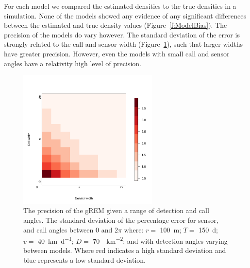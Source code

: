 \documentclass[a4paper,10pt,reqno,oneside]{amsart}
\begin{document}
For each model we compared the estimated densities to the true densities in a simulation. None of the models showed any evidence of any significant differences between the estimated and true density values (Figure~\ref{f:ModelBias}). The precision of the models do vary however. The standard deviation of the error is strongly related to the call and sensor width (Figure~\ref{f:StandardDevaition}), such that larger widths have greater precision. However, even the models with small call and sensor angles have a relativity high level of precision. 

\begin{figure}[t]
        \centering
		\includegraphics[width=7cm]{imgs/ResultStandardDeviation.pdf}
        \caption{The precision of the gREM given a range of detection and call angles. The standard deviation of the percentage error for sensor, and call angles between 0 and $2\pi$ where: $r = $ \SI{100}{\meter}; $T = $ \SI{150}{\day}; $v = $ \SI{40}{\kilo\meter\per\day}; $D = $ \SI{70}{\animals\per\kilo\meter\squared}; and with detection angles varying between models. Where red indicates a high standard deviation and blue represents a low standard deviation.} 
		\label{f:StandardDevaition}
\end{figure}
\end{document}
